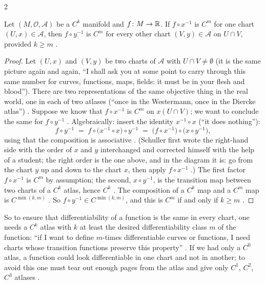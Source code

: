 \begin{paracol}{2}
\begin{theorem}\label{thm:dm-welldef}
Let $(M,\mathcal O,\mathcal A)$ be a $C^k$ manifold and $f\colon M\to\mathbb{R}$. If $f\circ x^{-1}$ is $C^m$ for one chart
$(U,x)\in\mathcal A$, then $f\circ y^{-1}$ is $C^m$ for every other chart $(V,y)\in\mathcal A$ on $U\cap V$, provided
$k\ge m$ .
\end{theorem}
\begin{proof}
Let $(U,x)$ and $(V,y)$ be two charts of $\mathcal A$ with $U\cap V\ne\emptyset$ (it is the same picture again and again,
``I shall ask you at some point to carry through this same number for curves, functions, maps, fields: it must be in
your flesh and blood''). There are two representations of the same objective thing in the real world, one in each of two atlases
(``once in the Westermann, once in the Diercke atlas'') .
Suppose we know that $f\circ x^{-1}$ is $C^m$ on $x(U\cap V)$; we want to conclude the same for $f\circ y^{-1}$
. Algebraically: insert the identity $x^{-1}\circ x$ (``it does nothing''):
\[
  f\circ y^{-1}\;=\;f\circ\bigl(x^{-1}\circ x\bigr)\circ y^{-1}\;=\;\bigl(f\circ x^{-1}\bigr)\circ\bigl(x\circ y^{-1}\bigr),
\]
using that the composition is associative .
(Schuller first wrote the right-hand side with the order of $x$ and $y$ interchanged and corrected himself with the help of a
student; the right order is the one above, and in the diagram it is: go from the chart $y$ up and down to the chart $x$, then
apply $f\circ x^{-1}$ .)
The first factor $f\circ x^{-1}$ is $C^m$ by assumption; the second, $x\circ y^{-1}$, is the transition map
between two charts of a $C^k$ atlas, hence $C^k$ .
The composition of a $C^k$ map and a $C^m$ map is $C^{\min(k,m)}$ . So
$f\circ y^{-1}\in C^{\min(k,m)}$, and this is $C^m$ if and only if $k\ge m$ .
\end{proof}
So to ensure that differentiability of a function is the same in every chart, one needs a $C^k$ atlas with $k$ at least
the desired differentiability class $m$ of the function: ``if I want to define $m$-times differentiable curves or
functions, I need charts whose transition functions preserve this property'' .
If we had only a $C^0$ atlas, a function could look differentiable in one chart and not in another; to avoid this one must
tear out enough pages from the atlas and give only $C^1$, $C^2$, $C^3$ atlases .


\end{paracol}

